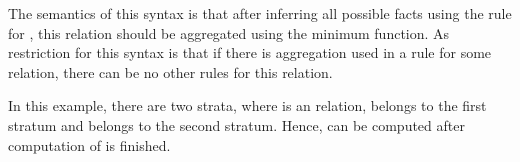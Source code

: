 
The semantics of this syntax is that after inferring all possible facts using the rule for , this relation should be aggregated using the minimum function. As restriction for this syntax is that if there is aggregation used in a rule for some relation, there can be no other rules for this relation.

In this example, there are two strata, where  is an \edb relation,  belongs to the first stratum and  belongs to the second stratum. Hence,  can be computed after computation of  is finished.


